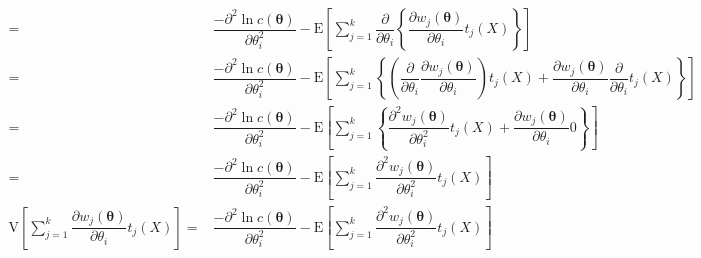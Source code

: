 \documentclass[
]{book}
\theoremstyle{definition}
\theoremstyle{definition}
\theoremstyle{definition}
\theoremstyle{definition}
\theoremstyle{remark}
\begin{document}
\[\begin{aligned}
= & \dfrac{-\partial^{2}\ln c\left(\boldsymbol{\theta}\right)}{\partial\theta_{{\scriptscriptstyle i}}^{2}}-\mathrm{E}\left[\sum\limits _{j=1}^{k}\dfrac{\partial}{\partial\theta_{{\scriptscriptstyle i}}}\left\{ \dfrac{\partial w_{{\scriptscriptstyle j}}\left(\boldsymbol{\theta}\right)}{\partial\theta_{{\scriptscriptstyle i}}}t_{{\scriptscriptstyle j}}\left(X\right)\right\} \right]\\
= & \dfrac{-\partial^{2}\ln c\left(\boldsymbol{\theta}\right)}{\partial\theta_{{\scriptscriptstyle i}}^{2}}-\mathrm{E}\left[\sum\limits _{j=1}^{k}\left\{ \left(\dfrac{\partial}{\partial\theta_{{\scriptscriptstyle i}}}\dfrac{\partial w_{{\scriptscriptstyle j}}\left(\boldsymbol{\theta}\right)}{\partial\theta_{{\scriptscriptstyle i}}}\right)t_{{\scriptscriptstyle j}}\left(X\right)+\dfrac{\partial w_{{\scriptscriptstyle j}}\left(\boldsymbol{\theta}\right)}{\partial\theta_{{\scriptscriptstyle i}}}\dfrac{\partial}{\partial\theta_{{\scriptscriptstyle i}}}t_{{\scriptscriptstyle j}}\left(X\right)\right\} \right]\\
= & \dfrac{-\partial^{2}\ln c\left(\boldsymbol{\theta}\right)}{\partial\theta_{{\scriptscriptstyle i}}^{2}}-\mathrm{E}\left[\sum\limits _{j=1}^{k}\left\{ \dfrac{\partial^{2}w_{{\scriptscriptstyle j}}\left(\boldsymbol{\theta}\right)}{\partial\theta_{{\scriptscriptstyle i}}^{2}}t_{{\scriptscriptstyle j}}\left(X\right)+\dfrac{\partial w_{{\scriptscriptstyle j}}\left(\boldsymbol{\theta}\right)}{\partial\theta_{{\scriptscriptstyle i}}}0\right\} \right]\\
= & \dfrac{-\partial^{2}\ln c\left(\boldsymbol{\theta}\right)}{\partial\theta_{{\scriptscriptstyle i}}^{2}}-\mathrm{E}\left[\sum\limits _{j=1}^{k}\dfrac{\partial^{2}w_{{\scriptscriptstyle j}}\left(\boldsymbol{\theta}\right)}{\partial\theta_{{\scriptscriptstyle i}}^{2}}t_{{\scriptscriptstyle j}}\left(X\right)\right]\\
\mathrm{V}\left[\sum\limits _{j=1}^{k}\dfrac{\partial w_{{\scriptscriptstyle j}}\left(\boldsymbol{\theta}\right)}{\partial\theta_{{\scriptscriptstyle i}}}t_{{\scriptscriptstyle j}}\left(X\right)\right]= & \dfrac{-\partial^{2}\ln c\left(\boldsymbol{\theta}\right)}{\partial\theta_{{\scriptscriptstyle i}}^{2}}-\mathrm{E}\left[\sum\limits _{j=1}^{k}\dfrac{\partial^{2}w_{{\scriptscriptstyle j}}\left(\boldsymbol{\theta}\right)}{\partial\theta_{{\scriptscriptstyle i}}^{2}}t_{{\scriptscriptstyle j}}\left(X\right)\right]
\end{aligned}
\]

\[
\tag*{$\Box$}
\]
\end{document}
